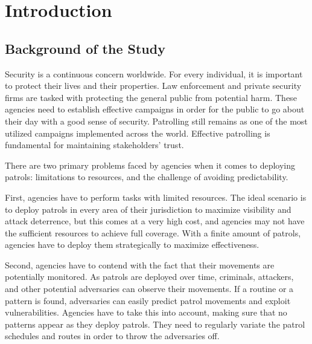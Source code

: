 \documentclass[journal]{./IEEE/IEEEtran}
\begin{document}
\section{Introduction}

\subsection{Background of the Study}
Security is a continuous concern worldwide. For every individual, it is important to protect their lives and their properties. Law enforcement and private security firms are tasked with protecting the general public from potential harm. These agencies need to establish effective campaigns in order for the public to go about their day with a good sense of security. Patrolling still remains as one of the most utilized campaigns implemented across the world. Effective patrolling is fundamental for maintaining stakeholders' trust.


There are two primary problems faced by agencies when it comes to deploying patrols: limitations to resources, and the challenge of avoiding predictability. 

First, agencies have to perform tasks with limited resources. The ideal scenario is to deploy patrols in every area of their jurisdiction to maximize visibility and attack deterrence, but this comes at a very high cost, and agencies may not have the sufficient resources to achieve full coverage. With a finite amount of patrols, agencies have to deploy them strategically to maximize effectiveness.

Second, agencies have to contend with the fact that their movements are potentially monitored. As patrols are deployed over time, criminals, attackers, and other potential adversaries can observe their movements. If a routine or a pattern is found, adversaries can easily predict patrol movements and exploit vulnerabilities. Agencies have to take this into account, making sure that no patterns appear as they deploy patrols. They need to regularly variate the patrol schedules and routes in order to throw the adversaries off.
\end{document}
